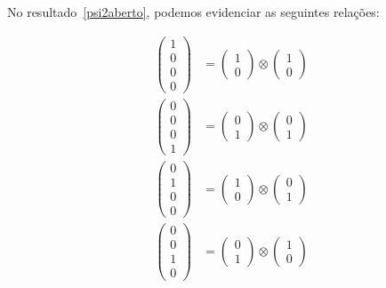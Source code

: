 No resultado~\eqref{psi2aberto}, podemos evidenciar as seguintes relações:

\begin{align}\label{prodtens1}
\begin{pmatrix}
1 \\
0 \\
0 \\
0
\end{pmatrix} &= \begin{pmatrix}
1 \\
0
\end{pmatrix} \otimes \begin{pmatrix}
1 \\
0
\end{pmatrix} \nonumber \\ 
\begin{pmatrix}
0 \\
0 \\
0 \\
1
\end{pmatrix} &= \begin{pmatrix}
0 \\
1
\end{pmatrix} \otimes \begin{pmatrix}
0 \\
1
\end{pmatrix} \nonumber \\ 
\begin{pmatrix}
0 \\
1 \\
0 \\
0
\end{pmatrix} &= \begin{pmatrix}
1 \\
0
\end{pmatrix} \otimes \begin{pmatrix}
0 \\
1
\end{pmatrix} \nonumber \\ 
\begin{pmatrix}
0 \\
0 \\
1 \\
0
\end{pmatrix} &= \begin{pmatrix}
0 \\
1
\end{pmatrix} \otimes \begin{pmatrix}
1 \\
0
\end{pmatrix} 
\end{align}


